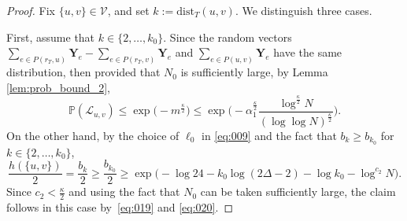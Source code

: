 \documentclass[11pt,leqno]{amsart}
\theoremstyle{remark}
\theoremstyle{plain}
\begin{document}
\begin{proof}
Fix $\{u,v\}\in\mathcal{V}$, and set $k:=\mathrm{dist}_T(u,v)$. We distinguish three cases.

First, assume that $k\in \{2,\dots,k_0\}$. Since the random vectors
$\sum_{e\in P(r_T,u)}\mathbf{Y}_e - \sum_{e\in P(r_T,v)}\mathbf{Y}_e$ and
$\sum_{e\in P(u,v)}\mathbf{Y}_e $ have the same distribution, then provided that $N_0$ is sufficiently large,
by Lemma \ref{lem:prob_bound_2},
\begin{equation}\label{eq:019}
\mathbb{P}(\mathcal{L}_{u,v})\leqslant \exp\big(- m ^{\frac{\kappa}{2}}\big) \leqslant
\exp\Big(- \alpha_1^{\frac{\kappa}{2}}\frac{\log^{\frac{\kappa}{2}}N}{(\log\log N)^{\frac{\kappa}{2}}}\Big).
\end{equation}
On the other hand, by the choice of $\ell_0$ in \eqref{eq:009} and the fact that $b_k\geqslant b_{k_0}$ for $k\in \{2,\dots, k_0\}$,
\begin{equation}\label{eq:020}
\frac{h(\{u,v\})}{2} =\frac{b_k}{2} \geqslant \frac{b_{k_0}}{2} \geqslant
\exp\big(-\log 24-k_0\log(2\Delta-2)-\log k_0 - \log^{c_2}N\big).
\end{equation}
Since $c_2<\frac{\kappa}{2}$ and using the fact that $N_0$ can be taken sufficiently large, the claim
follows in this case by~\eqref{eq:019} and \eqref{eq:020}.


\end{proof}
\end{document}

